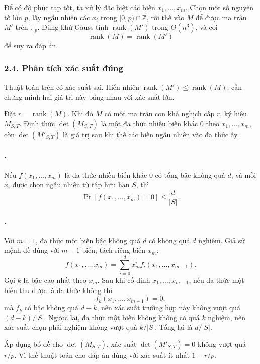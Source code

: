 \documentclass[11pt]{article}
\begin{document}
Để có độ phức tạp tốt, ta xử lý đặc biệt các biến \(x_1,\ldots,x_m\). Chọn một
số nguyên tố lớn \(p\), lấy ngẫu nhiên các \(x_i\) trong
\([0,p)\cap\mathbb Z\), rồi thế vào \(M\) để được ma trận \(M'\) trên
\(\mathbb F_p\). Dùng khử Gauss tính \(\operatorname{rank}(M')\) trong
\(O(n^3)\), và coi
\[
  \operatorname{rank}(M)=\operatorname{rank}(M')
\]
để suy ra đáp án.

\subsubsection*{2.4. Phân tích xác suất đúng}

Thuật toán trên có xác suất sai. Hiển nhiên
\(\operatorname{rank}(M')\le \operatorname{rank}(M)\); cần chứng minh hai giá trị
này bằng nhau với xác suất lớn.

Đặt \(r=\operatorname{rank}(M)\). Khi đó \(M\) có một ma trận con khả nghịch cấp
\(r\), ký hiệu \(M_{S,T}\). Định thức \(\det(M_{S,T})\) là một đa thức nhiều biến
khác \(0\) theo \(x_1,\ldots,x_m\), còn \(\det(M'_{S,T})\) là giá trị sau khi thế
các biến ngẫu nhiên vào đa thức ấy.

\paragraph{.}
Nếu \(f(x_1,\ldots,x_m)\) là đa thức nhiều biến khác \(0\) có tổng bậc không quá
\(d\), và mỗi \(x_i\) được chọn ngẫu nhiên từ tập hữu hạn \(S\), thì
\[
  \Pr[f(x_1,\ldots,x_m)=0]\le \frac{d}{|S|}.
\]

\paragraph{.}
Với \(m=1\), đa thức một biến bậc không quá \(d\) có không quá \(d\) nghiệm.
Giả sử mệnh đề đúng với \(m-1\) biến, tách riêng biến \(x_m\):
\[
  f(x_1,\ldots,x_m)=\sum_{i=0}^{d}x_m^i f_i(x_1,\ldots,x_{m-1}).
\]
Gọi \(k\) là bậc cao nhất theo \(x_m\). Sau khi cố định
\(x_1,\ldots,x_{m-1}\), nếu đa thức một biến thu được là đa thức không thì
\[
  f_k(x_1,\ldots,x_{m-1})=0,
\]
mà \(f_k\) có bậc không quá \(d-k\), nên xác suất trường hợp này không vượt quá
\((d-k)/|S|\). Ngược lại, đa thức một biến không không có quá \(k\) nghiệm, nên
xác suất chọn phải nghiệm không vượt quá \(k/|S|\). Tổng lại là \(d/|S|\).

Áp dụng bổ đề cho \(\det(M_{S,T})\), xác suất
\(\det(M'_{S,T})=0\) không vượt quá \(r/p\). Vì thế thuật toán cho đáp án đúng
với xác suất ít nhất \(1-r/p\).
\end{document}
